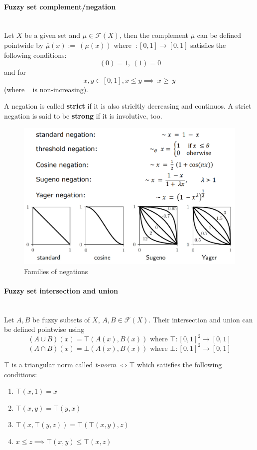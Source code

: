 \documentclass{article}
\begin{document}
\paragraph{Fuzzy set complement/negation}\mbox{}\\
Let $X$ be a given set and $\mu\in\mathcal{F}(X)$, then the complement $\overline{\mu}$ can be
defined pointwide by $\overline{\mu}(x):=~(\mu(x))$ where $~:[0,1]\rightarrow [0,1]$
satisfies the following conditions:
$$~(0)=1,~(1)=0$$
and for $$x,y\in [0,1],x\leq y\implies ~x\geq ~y$$ (where ~ is non-increasing).

A negation is called \textbf{strict} if it is also stricltly decreasing and continuos. A strict
negation is said to be \textbf{strong} if it is involutive, too.

\begin{figure}[H]
    \centering
    \includegraphics[scale=0.45]{images/neg-families.png}
    \caption{Families of negations}
\end{figure}

\paragraph{Fuzzy set intersection and union}\mbox{}\\
Let $A,B$ be fuzzy subsets of $X$, $A,B\in\mathcal{F}(X)$. Their intersection and union can be
defined pointwise using
$$(A\cup B)(x) = \top(A(x),B(x))\text{ where }\top:[0,1]^2\rightarrow [0,1]$$
$$(A\cap B)(x) = \bot(A(x),B(x))\text{ where }\bot:[0,1]^2\rightarrow [0,1]$$

\noindent$\top$ is a triangular norm called \textit{t-norm} $\Longleftrightarrow\top$ which satisfies
the following conditions:
\begin{enumerate}
    \item $\top (x,1)=x$
    \item $\top(x,y)=\top(y,x)$
    \item $\top(x,\top(y,z))=\top(\top(x,y),z)$
    \item $x\leq z\implies \top(x,y)\leq\top(x,z)$
\end{enumerate}
\end{document}
